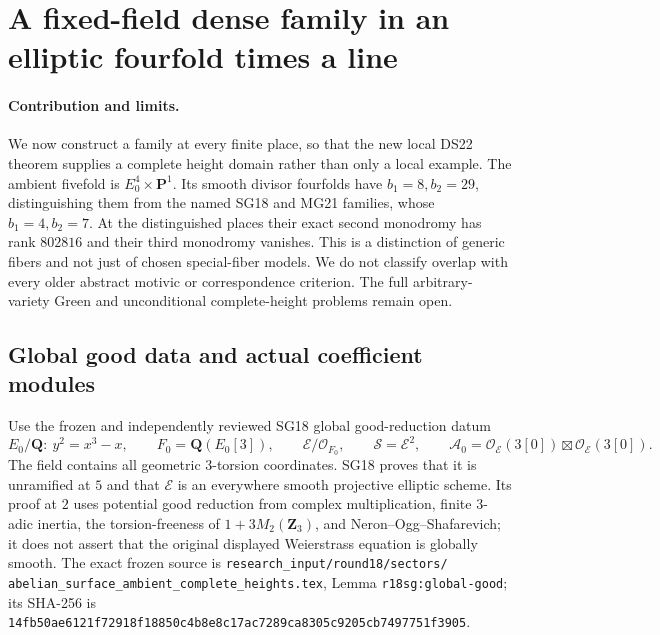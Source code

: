 \section{A fixed-field dense family in an elliptic fourfold times a line}
\label{r22dg:section}

\paragraph{Contribution and limits.}
We now construct a family at every finite place, so that the new local
DS22 theorem supplies a complete height domain rather than only a local
example.  The ambient fivefold is $E_0^4\times\mathbf P^1$.
Its smooth divisor fourfolds have $b_1=8,b_2=29$, distinguishing them
from the named SG18 and MG21 families, whose $b_1=4,b_2=7$.
At the distinguished places their exact second monodromy has rank
$802816$ and their third monodromy vanishes.  This is a distinction
of generic fibers and not just of chosen special-fiber models.
We do not classify overlap with every older abstract motivic or
correspondence criterion.  The full arbitrary-variety Green and
unconditional complete-height problems remain open.

\subsection{Global good data and actual coefficient modules}

Use the frozen and independently reviewed SG18 global good-reduction
datum
\[
 E_0/\mathbf Q:\ y^2=x^3-x,\qquad
 F_0=\mathbf Q(E_0[3]),\qquad
 \mathcal E/\mathcal O_{F_0},\qquad
 \mathcal S=\mathcal E^2,
 \qquad \mathcal A_0=\mathcal O_{\mathcal E}(3[0])
                         \boxtimes\mathcal O_{\mathcal E}(3[0]).
 \tag{DG22.1}\label{r22dg:good}
\]
The field contains all geometric $3$-torsion coordinates.  SG18 proves
that it is unramified at $5$ and that $\mathcal E$ is an everywhere
smooth projective elliptic scheme.  Its proof at $2$ uses potential
good reduction from complex multiplication, finite $3$-adic inertia,
the torsion-freeness of $1+3M_2(\mathbf Z_3)$, and
Neron--Ogg--Shafarevich; it does not assert that the original displayed
Weierstrass equation is globally smooth.  The exact frozen source is
\texttt{research\_input/round18/sectors/}
\texttt{abelian\_surface\_ambient\_complete\_heights.tex},
Lemma \texttt{r18sg:global-good}; its SHA-256 is
\texttt{14fb50ae6121f72918f18850c4b8e8c17ac7289ca8305c9205cb7497751f3905}.

